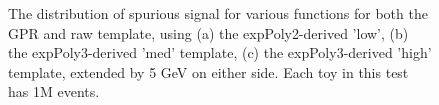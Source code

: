 \begin{figure} 
\begin{center}

\caption{The distribution of spurious signal for various functions for both the GPR and raw template, using (a) the expPoly2-derived 'low', (b) the expPoly3-derived 'med' template, (c) the expPoly3-derived 'high' template, extended by 5 GeV on either side. Each toy in this test has 1M events.}
\label{fig:padded_lowpt_1M_noSig}
\end{center}
\end{figure}

